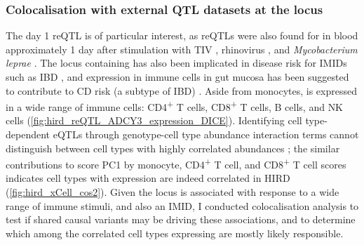 %
%
%

\subsubsection{Colocalisation with external QTL datasets at the  locus}

The day 1  \gls{reQTL} is of particular interest,
as \glspl{reQTL} were also found for  in blood approximately 1 day after stimulation with \gls{TIV} \autocite{franco2013IntegrativeGenomicAnalysis}, rhinovirus \autocite{caliskan2015HostGeneticVariation}, and \textit{Mycobacterium leprae} \autocite{manry2017DecipheringGeneticControl}.
The locus containing  has also been implicated in disease risk for \glspl{IMID} such as \gls{IBD} \autocite{delange2017GenomewideAssociationStudy},
and  expression in immune cells in gut mucosa has been suggested to contribute to \gls{CD} risk (a subtype of \gls{IBD}) \autocite{marigorta2017TranscriptionalRiskScores}.
Aside from monocytes,  is expressed in a wide range of immune cells: CD4\textsuperscript{+} T cells, CD8\textsuperscript{+} T cells, B cells, and \gls{NK} cells (\cref{fig:hird_reQTL_ADCY3_expression_DICE}).
Identifying cell type-dependent \glspl{eQTL} through genotype-cell type abundance interaction terms cannot distinguish between cell types with highly correlated abundances \autocite{kim-hellmuth2020CellTypeSpecific};
the similar contributions to  score \gls{PC}1 by monocyte, CD4\textsuperscript{+} T cell, and CD8\textsuperscript{+} T cell scores indicates cell types with  expression are indeed correlated in \gls{HIRD} (\cref{fig:hird_xCell_cos2}).
Given the  locus is associated with response to a wide range of immune stimuli, and also an \gls{IMID},
I conducted colocalisation analysis to test if shared causal variants may be driving these associations,
and to determine which among the correlated cell types expressing  are mostly likely responsible.

